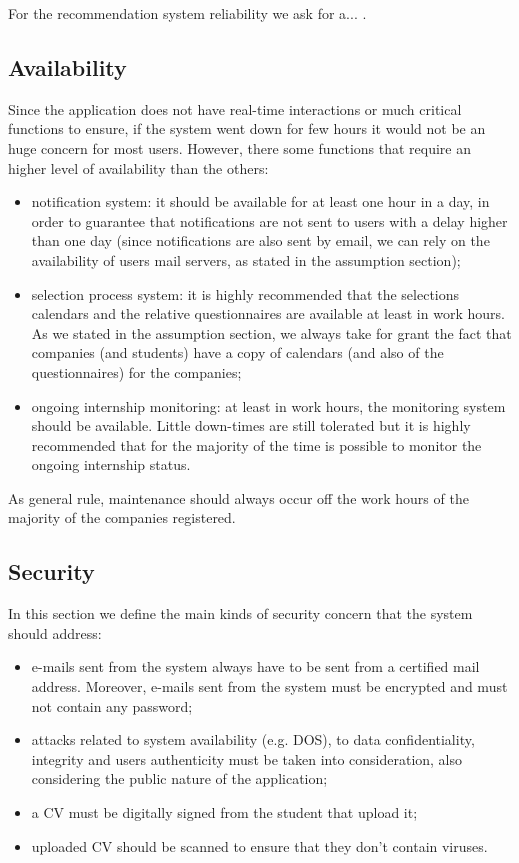 			For the recommendation system reliability we ask for a... .
		\subsection{Availability}
			Since the application does not have real-time interactions or much critical functions to ensure, if the system went down for few hours it would not be an huge concern for most users. However, there some functions that require an higher level of availability than the others:
			\begin{itemize}
				\item notification system: it should be available for at least one hour in a day, in order to guarantee that notifications are not sent to users with a delay higher than one day (since notifications are also sent by email, we can rely on the availability of users mail servers, as stated in the assumption section);
				\item selection process system: it is highly recommended that the selections calendars and the relative questionnaires are available at least in work hours. As we stated in the assumption section, we always take for grant the fact that companies (and students) have a copy of calendars (and also of the questionnaires) for the companies;
				\item ongoing internship monitoring: at least in work hours, the monitoring system should be available. Little down-times are still tolerated but it is highly recommended that for the majority of the time is possible to monitor the ongoing internship status.
			\end{itemize}
			As general rule, maintenance should always occur off the work hours of the majority of the companies registered.
		\subsection{Security}
			In this section we define the main kinds of security concern that the system should address:
			\begin{itemize}
				\item e-mails sent from the system always have to be sent from a certified mail address. Moreover, e-mails sent from the system must be encrypted and must not contain any password;
				\item attacks related to system availability (e.g. DOS), to data confidentiality, integrity and users authenticity must be taken into consideration, also considering the public nature of the application;
				\item a CV must be digitally signed from the student that upload it;
				\item uploaded CV should be scanned to ensure that they don't contain viruses.
			\end{itemize}
